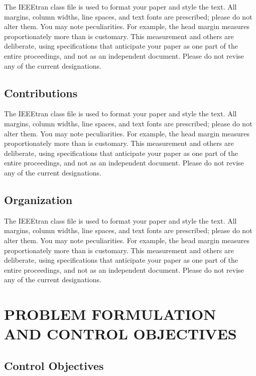 \documentclass[letterpaper, journal]{IEEEtran}
\begin{document}
The IEEEtran class file is used to format your paper and style the text. All margins, 
column widths, line spaces, and text fonts are prescribed; please do not 
alter them. You may note peculiarities. For example, the head margin
measures proportionately more than is customary. This measurement 
and others are deliberate, using specifications that anticipate your paper 
as one part of the entire proceedings, and not as an independent document. 
Please do not revise any of the current designations.

\subsection{Contributions}

The IEEEtran class file is used to format your paper and style the text. All margins, 
column widths, line spaces, and text fonts are prescribed; please do not 
alter them. You may note peculiarities. For example, the head margin
measures proportionately more than is customary. This measurement 
and others are deliberate, using specifications that anticipate your paper 
as one part of the entire proceedings, and not as an independent document. 
Please do not revise any of the current designations.

\subsection{Organization}

The IEEEtran class file is used to format your paper and style the text. All margins, 
column widths, line spaces, and text fonts are prescribed; please do not 
alter them. You may note peculiarities. For example, the head margin
measures proportionately more than is customary. This measurement 
and others are deliberate, using specifications that anticipate your paper 
as one part of the entire proceedings, and not as an independent document. 
Please do not revise any of the current designations.



\section{PROBLEM FORMULATION AND CONTROL OBJECTIVES}


\subsection{Control Objectives}
\end{document}
